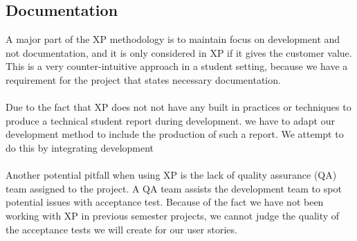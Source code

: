 \subsection{Documentation}
A major part of the XP methodology is to maintain focus on development and not documentation, and it is only considered in XP if it gives the customer value. This is a very counter-intuitive approach in a student setting, because we have a requirement for the project that states necessary documentation. 
\\\\
Due to the fact that XP does not not have any built in practices or techniques to produce a technical student report during development. we have to adapt our development method to include the production of such a report. We attempt to do this by integrating development 
\\\\
Another potential pitfall when using XP is the lack of quality assurance (QA) team assigned to the project. A QA team assists the development team to spot potential issues with acceptance test. Because of the fact we have not been working with XP in previous semester projects, we cannot judge the quality of the acceptance tests we will create for our user stories.







